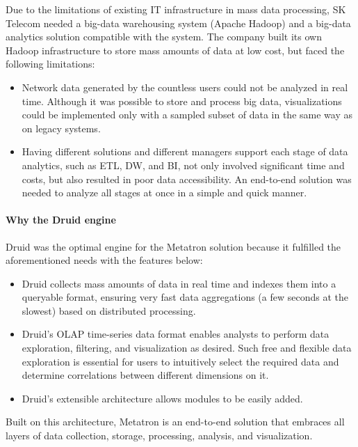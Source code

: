 \documentclass[letterpaper,10pt,english]{sphinxmanual}
\begin{document}
Due to the limitations of existing IT infrastructure in mass data processing, SK Telecom needed a big-data warehousing system (Apache Hadoop) and a big-data analytics solution compatible with the system. The company built its own Hadoop infrastructure to store mass amounts of data at low cost, but faced the following limitations:
\begin{itemize}
\item {} 
Network data generated by the countless users could not be analyzed in real time. Although it was possible to store and process big data, visualizations could be implemented only with a sampled subset of data in the same way as on legacy systems.

\item {} 
Having different solutions and different managers support each stage of data analytics, such as ETL, DW, and BI, not only involved significant time and costs, but also resulted in poor data accessibility. An end-to-end solution was needed to analyze all stages at once in a simple and quick manner.

\end{itemize}


\paragraph{Why the Druid engine}
\label{\detokenize{discovery/part01/druid_to_metatron:druid}}
Druid was the optimal engine for the Metatron solution because it fulfilled the aforementioned needs with the features below:
\begin{itemize}
\item {} 
Druid collects mass amounts of data in real time and indexes them into a queryable format, ensuring very fast data aggregations (a few seconds at the slowest) based on distributed processing.

\item {} 
Druid’s OLAP time-series data format enables analysts to perform data exploration, filtering, and visualization as desired. Such free and flexible data exploration is essential for users to intuitively select the required data and determine correlations between different dimensions on it.

\item {} 
Druid’s extensible architecture allows modules to be easily added.

\end{itemize}

Built on this architecture, Metatron is an end-to-end solution that embraces all layers of data collection, storage, processing, analysis, and visualization.
\end{document}

